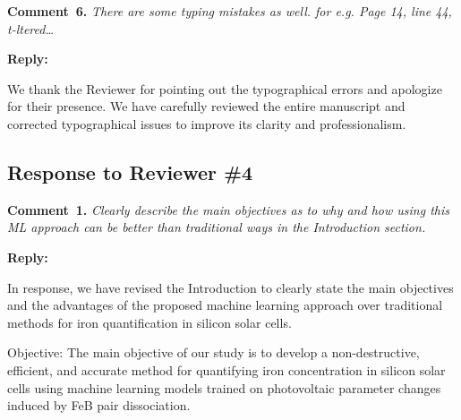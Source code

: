 \documentclass[a4paper,fleqn]{cas-sc}
\begin{document}
\textcolor[rgb]{1.00,0.07,0.00}{
\hl{}}


\vspace{1cm}
\noindent
\textcolor[rgb]{0.00,0.50,1.00}{\textbf{Comment~6.}}
\emph{There are some typing mistakes as well. for e.g. Page 14, line 44, t-ltered…}

\noindent
\textcolor[rgb]{0.51,0.00,0.00}{\textbf{Reply:}}

We thank the Reviewer for pointing out the typographical errors and apologize for their presence.
We have carefully reviewed the entire manuscript and corrected typographical issues to improve its clarity and  professionalism.


\vspace{1cm}
\subsection*{Response to Reviewer \#4 }

\noindent
\textcolor[rgb]{0.00,0.50,1.00}{\textbf{Comment~1.}}
\emph{Clearly describe the main objectives as to why and how using this ML approach can be better than traditional ways in the Introduction section.}

\noindent
\textcolor[rgb]{0.51,0.00,0.00}{\textbf{Reply:}}


In response, we have revised the Introduction to clearly state the main objectives and the advantages of the proposed machine learning approach over traditional methods for iron quantification in silicon solar cells.


Objective:
The main objective of our study is to develop a non-destructive, efficient, and accurate method for quantifying iron concentration in silicon solar cells using machine learning models trained on photovoltaic parameter changes induced by FeB pair dissociation.
\end{document}
